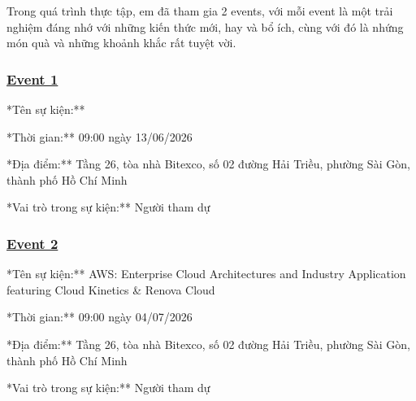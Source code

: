 Trong quá trình thực tập, em đã tham gia 2 events, với mỗi event là một
trải nghiệm đáng nhớ với những kiến thức mới, hay và bổ ích, cùng với đó
là nhứng món quà và những khoảnh khắc rất tuyệt vời.

\subsubsection{\texorpdfstring{\href{4.1-Event1/}{Event
1}}{Event 1}}

\qquad **Tên sự kiện:**

\qquad **Thời gian:** 09:00 ngày 13/06/2026

\qquad **Địa điểm:** Tầng 26, tòa nhà Bitexco, số 02 đường Hải Triều,
phường Sài Gòn, thành phố Hồ Chí Minh

\qquad **Vai trò trong sự kiện:** Người tham dự

\subsubsection{\texorpdfstring{\href{4.2-Event2/}{Event
2}}{Event 2}}

\qquad **Tên sự kiện:** AWS: Enterprise Cloud Architectures and Industry
Application featuring Cloud Kinetics \& Renova Cloud

\qquad **Thời gian:** 09:00 ngày 04/07/2026

\qquad **Địa điểm:** Tầng 26, tòa nhà Bitexco, số 02 đường Hải Triều,
phường Sài Gòn, thành phố Hồ Chí Minh

\qquad **Vai trò trong sự kiện:** Người tham dự
